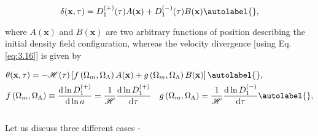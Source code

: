 \begin{equation}
    \delta(\mathbf{x}, \tau)=D_{1}^{(+)}(\tau) A(\mathbf{x})+D_{1}^{(-)}(\tau) B(\mathbf{x}) \autolabel{},
\end{equation}


where $A(\mathbf{x})$ and $B(\mathbf{x})$ are two arbitrary functions of position describing the initial density field configuration, whereas the velocity divergence [using Eq.\eqref{eq:3.16}] is given by


\begin{align*}
    & \theta(\mathbf{x}, \tau)=-\mathcal{H}(\tau)\left[f\left(\Omega_{m}, \Omega_{\Lambda}\right) A(\mathbf{x})+g\left(\Omega_{m}, \Omega_{\Lambda}\right) B(\mathbf{x})\right]  \autolabel{},\\
    & f\left(\Omega_{m}, \Omega_{\Lambda}\right) \equiv \frac{\mathrm{d} \ln D_{1}^{(+)}}{\mathrm{d} \ln a}=\frac{1}{\mathcal{H}} \frac{\mathrm{d} \ln D_{1}^{(+)}}{\mathrm{d} \tau} \quad g\left(\Omega_{m}, \Omega_{\Lambda}\right)=\frac{1}{\mathcal{H}} \frac{\mathrm{d} \ln D_{1}^{(-)}}{\mathrm{d} \tau} \autolabel{},
\end{align*}\\

Let us discuss three different cases -

